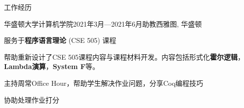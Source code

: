 \documentclass{resume}
\begin{document}
\begin{rSection}{工作经历}
		\begin{rSubsection}{华盛顿大学计算机学院}{2021年3月---2021年6月}{助教}{西雅图, 华盛顿}
			\item 服务于\textbf{程序语言理论} (CSE 505) 课程
			\item 帮助重新设计了CSE 505课程内容与课程材料开发。内容包括形式化\textbf{霍尔逻辑}，\textbf{Lambda演算}，\textbf{System F}等。
			\item 主持周常Office Hour，帮助学生解决作业问题，分享Coq编程技巧
			\item 协助处理作业打分
		\end{rSubsection}


		\vspace{-5pt}


	\end{rSection}
	\vspace{-5pt}
\end{document}
